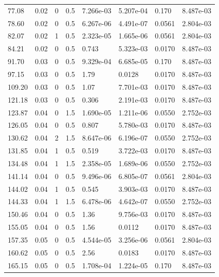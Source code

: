 \documentclass[preview]{standalone}
\begin{document}
{{\begin{tabular}{L{1.2cm}C{1.2cm} C{0.3cm}C{0.5cm} C{1.4cm}C{1.4cm} C{1.4cm}C{1.4cm}}
  77.08  &  0.02  & 0     & 0.5 &  7.266e-03  & 5.207e-04  & 0.170 &  8.487e-03   \\ 
  78.60  &  0.02  & 0     & 0.5 &  6.267e-06  & 4.491e-07  & 0.0561 &  2.804e-03   \\ 
  82.07  &  0.02  & 1     & 0.5 &  2.323e-05  & 1.665e-06  & 0.0561 &  2.804e-03   \\ 
  84.21  &  0.02  & 0     & 0.5 &  0.743  & 5.323e-03  & 0.0170 &  8.487e-03   \\ 
  91.70  &  0.03  & 0     & 0.5 &  9.329e-04  & 6.685e-05  & 0.170 &  8.487e-03   \\ 
  97.15  &  0.03  & 0     & 0.5 &  1.79  & 0.0128  & 0.0170 &  8.487e-03   \\ 
  109.20  &  0.03  & 0     & 0.5 &  1.07  & 7.701e-03  & 0.0170 &  8.487e-03   \\ 
  121.18  &  0.03  & 0     & 0.5 &  0.306  & 2.191e-03  & 0.0170 &  8.487e-03   \\ 
  123.87  &  0.04  & 0     & 1.5 &  1.690e-05  & 1.211e-06  & 0.0550 &  2.752e-03   \\ 
  126.05  &  0.04  & 0     & 0.5 &  0.807  & 5.780e-03  & 0.0170 &  8.487e-03   \\ 
  130.62  &  0.04  & 2     & 1.5 &  8.647e-06  & 6.196e-07  & 0.0550 &  2.752e-03   \\ 
  131.85  &  0.04  & 1     & 0.5 &  0.519  & 3.722e-03  & 0.0170 &  8.487e-03   \\ 
  134.48  &  0.04  & 1     & 1.5 &  2.358e-05  & 1.689e-06  & 0.0550 &  2.752e-03   \\ 
  141.14  &  0.04  & 0     & 0.5 &  9.496e-06  & 6.805e-07  & 0.0561 &  2.804e-03   \\ 
  144.02  &  0.04  & 1     & 0.5 &  0.545  & 3.903e-03  & 0.0170 &  8.487e-03   \\ 
  144.33  &  0.04  & 1     & 1.5 &  6.478e-06  & 4.642e-07  & 0.0550 &  2.752e-03   \\ 
  150.46  &  0.04  & 0     & 0.5 &  1.36  & 9.756e-03  & 0.0170 &  8.487e-03   \\ 
  155.05  &  0.04  & 0     & 0.5 &  1.56  & 0.0112  & 0.0170 &  8.487e-03   \\ 
  157.35  &  0.05  & 0     & 0.5 &  4.544e-05  & 3.256e-06  & 0.0561 &  2.804e-03   \\ 
  160.62  &  0.05  & 0     & 0.5 &  2.56  & 0.0183  & 0.0170 &  8.487e-03   \\ 
  165.15  &  0.05  & 0     & 0.5 &  1.708e-04  & 1.224e-05  & 0.170 &  8.487e-03   \\ 

\end{tabular}}}
\end{document}
